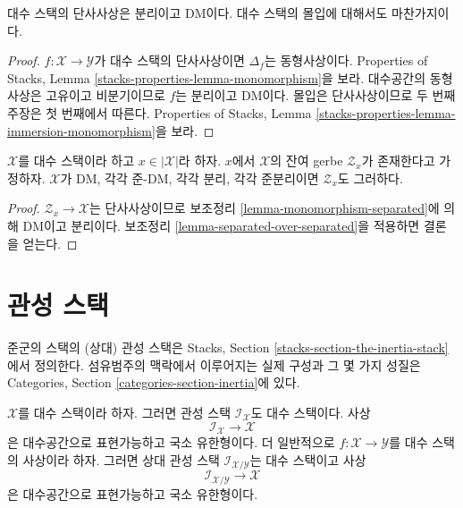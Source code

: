 \begin{lemma}
\label{lemma-monomorphism-separated}
대수 스택의 단사사상은 분리이고 DM이다.
대수 스택의 몰입에 대해서도 마찬가지이다.
\end{lemma}

\begin{proof}
$f : \mathcal{X} \to \mathcal{Y}$가 대수 스택의 단사사상이면
$\Delta_f$는 동형사상이다. Properties of Stacks, Lemma
\ref{stacks-properties-lemma-monomorphism}을 보라.
대수공간의 동형사상은 고유이고 비분기이므로 $f$는 분리이고 DM이다.
몰입은 단사사상이므로 두 번째 주장은 첫 번째에서 따른다.
Properties of Stacks, Lemma
\ref{stacks-properties-lemma-immersion-monomorphism}을 보라.
\end{proof}

\begin{lemma}
\label{lemma-separation-properties-residual-gerbe}
$\mathcal{X}$를 대수 스택이라 하고 $x \in |\mathcal{X}|$라 하자.
$x$에서 $\mathcal{X}$의 잔여 gerbe $\mathcal{Z}_x$가 존재한다고
가정하자. $\mathcal{X}$가 DM, 각각 준-DM, 각각 분리,
각각 준분리이면 $\mathcal{Z}_x$도 그러하다.
\end{lemma}

\begin{proof}
$\mathcal{Z}_x \to \mathcal{X}$는 단사사상이므로 보조정리
\ref{lemma-monomorphism-separated}에 의해 DM이고 분리이다.
보조정리 \ref{lemma-separated-over-separated}을 적용하면 결론을 얻는다.
\end{proof}


















\section{관성 스택}
\label{section-inertia}

\noindent
준군의 스택의 (상대) 관성 스택은 Stacks, Section
\ref{stacks-section-the-inertia-stack}에서 정의한다.
섬유범주의 맥락에서 이루어지는 실제 구성과 그 몇 가지 성질은
Categories, Section \ref{categories-section-inertia}에 있다.

\begin{lemma}
\label{lemma-inertia}
$\mathcal{X}$를 대수 스택이라 하자. 그러면 관성 스택
$\mathcal{I}_\mathcal{X}$도 대수 스택이다. 사상
$$
\mathcal{I}_\mathcal{X} \longrightarrow \mathcal{X}
$$
은 대수공간으로 표현가능하고 국소 유한형이다.
더 일반적으로 $f : \mathcal{X} \to \mathcal{Y}$를
대수 스택의 사상이라 하자. 그러면 상대 관성 스택
$\mathcal{I}_{\mathcal{X}/\mathcal{Y}}$는 대수 스택이고 사상
$$
\mathcal{I}_{\mathcal{X}/\mathcal{Y}} \longrightarrow \mathcal{X}
$$
은 대수공간으로 표현가능하고 국소 유한형이다.
\end{lemma}

